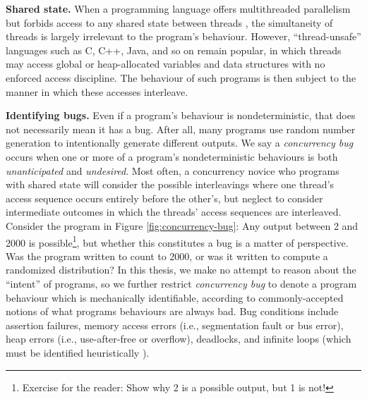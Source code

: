 {\bf Shared state.}
When a programming language offers multithreaded parallelism but forbids access to any shared state between threads \cite{rust-language},
the simultaneity of threads is largely irrelevant to the program's behaviour.
However, ``thread-unsafe'' languages such as C, C++, Java, and so on remain popular,
in which threads may access global or heap-allocated variables and data structures with no enforced access discipline.
The behaviour of such programs is then subject to the manner in which these accesses interleave.

{\bf Identifying bugs.}
Even if a program's behaviour is nondeterministic, that does not necessarily mean it has a bug.
After all, many programs use random number generation to intentionally generate different outputs.
We say a {\em concurrency bug} occurs when one or more of a program's nondeterministic behaviours is both {\em unanticipated} and {\em undesired}.
Most often, a concurrency novice who programs with shared state will consider the possible interleavings where one thread's access sequence occurs entirely before the other's, but neglect to consider intermediate outcomes in which the threads' access sequences are interleaved.
%
Consider the program in Figure \ref{fig:concurrency-bug}: Any output between 2 and 2000 is possible\footnote{
	Exercise for the reader: Show why 2 is a possible output, but 1 is not!
},
but whether this constitutes a bug is a matter of perspective.
Was the program written to count to 2000, or was it written to compute a randomized distribution?
In this thesis, we make no attempt to reason about the ``intent'' of programs,
so we further restrict {\em concurrency bug} to denote a program behaviour which is mechanically identifiable,
according to commonly-accepted notions of what programs behaviours are always bad.
%
Bug conditions include assertion failures,
memory access errors (i.e., segmentation fault or bus error),
heap errors (i.e., use-after-free or overflow),
deadlocks,
and infinite loops (which must be identified heuristically \cite{entscheidungsproblem}).

